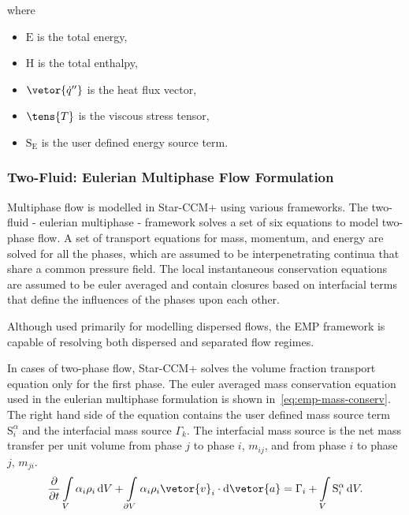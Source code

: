 \noindent where
\begin{itemize}[topsep=0pt, labelindent=40pt,labelsep=5pt, parsep = 2pt, listparindent=2em]
\item $\mathrm{E}$ is the total energy,
\item $\mathrm{H}$ is the total enthalpy,
\item $\vetor{\dot{q}''}$ is the heat flux vector,
\item $\tens{T}$ is the viscous stress tensor,
\item $\mathrm{S}_{\mathrm{E}}$ is the user defined energy source term.
\end{itemize}

\subsubsection{Two-Fluid: Eulerian Multiphase Flow Formulation}
Multiphase flow is modelled in Star-CCM+ using various frameworks. The two-fluid - eulerian multiphase - framework solves a set of six equations
to model two-phase flow. A set of transport equations for mass, momentum, and energy are solved for all the phases, which are assumed to
be interpenetrating continua that share a common pressure field. The local instantaneous conservation equations are assumed to be euler averaged and
contain closures based on interfacial terms that define the influences of the phases upon each other.

Although used primarily for modelling dispersed flows, the EMP framework is capable
of resolving both dispersed and separated flow regimes.

In cases of two-phase flow, Star-CCM+ solves the volume fraction transport equation only for the first phase.
The euler averaged mass conservation equation used in the eulerian 
 multiphase formulation is shown in~\ref{eq:emp-mass-conserv}. 
 The right hand side of the equation contains the user defined mass
 source term $\mathrm{S}^{\alpha}_{i}$ and the interfacial mass
 source $\Gamma_k$. The interfacial mass source is the net 
 mass transfer per unit volume from phase $j$ to phase $i$, $m_{ij}$, 
 and from phase $i$ to phase $j$, $m_{ji}$. 
\begin{equation}\label{eq:emp-mass-conserv}
\frac{\partial}{\partial t}
\int\limits_{V} \alpha_{i} \rho_{i} \,\mathrm{d}V
+ \int\limits_{\partial V} \alpha_{i} \rho_{i} \vetor{v}_{i} \cdot \mathrm{d}\vetor{a}
= \Gamma_{i}
+ \int\limits_{V} \mathrm{S}^{\alpha}_{i} \,\mathrm{d}V.
\end{equation}

